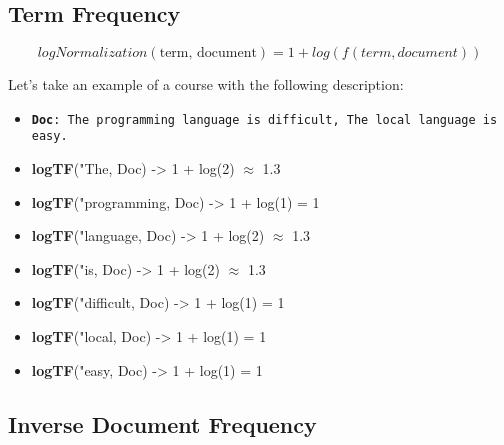 \subsection{Term Frequency}

\begin{equation}
    logNormalization(\text{term, document}) = 1 + log(f(term, document))
\end{equation}

\noindent Let's take an example of a course with the following description:
\begin{itemize}
    \item \texttt{\textbf{Doc}: The programming language is difficult, The local language is easy.}
\end{itemize}


\begin{itemize}
    \item[] \textbf{logTF}("The, Doc) \hspace{2cm} -> \hspace{0.5cm} 1 + log(2) $\approx$ 1.3
    \item[] \textbf{logTF}("programming, Doc) \hspace{0.43cm} -> \hspace{0.5cm} 1 + log(1) = 1
    \item[] \textbf{logTF}("language, Doc) \hspace{1.18cm} -> \hspace{0.5cm} 1 + log(2) $\approx$ 1.3
    \item[] \textbf{logTF}("is, Doc) \hspace{2.36cm} -> \hspace{0.5cm} 1 + log(2) $\approx$ 1.3
    \item[] \textbf{logTF}("difficult, Doc) \hspace{1.38cm} -> \hspace{0.5cm} 1 + log(1) = 1
    \item[] \textbf{logTF}("local, Doc) \hspace{1.85cm} -> \hspace{0.5cm} 1 + log(1) = 1
    \item[] \textbf{logTF}("easy, Doc) \hspace{1.94cm} -> \hspace{0.5cm} 1 + log(1) = 1
\end{itemize}

\subsection{Inverse Document Frequency}


